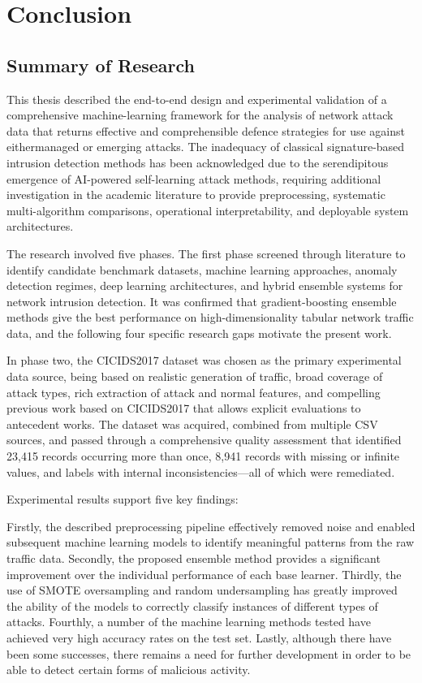 \chapter{Conclusion}

\label{chap:conclusion}

\setlength{\parskip}{0.8em}

\section{Summary of Research}

This thesis described the end-to-end design and experimental validation of a comprehensive machine-learning framework for the analysis of network attack data that returns effective and comprehensible defence strategies for use against eithermanaged or emerging attacks. The inadequacy of classical signature-based intrusion detection methods has been acknowledged due to the serendipitous emergence of AI-powered self-learning attack methods, requiring additional investigation in the academic literature to provide preprocessing, systematic multi-algorithm comparisons, operational interpretability, and deployable system architectures.

The research involved five phases. The first phase screened through literature to identify candidate benchmark datasets, machine learning approaches, anomaly detection regimes, deep learning architectures, and hybrid ensemble systems for network intrusion detection. It was confirmed that gradient-boosting ensemble methods give the best performance on high-dimensionality tabular network traffic data, and the following four specific research gaps motivate the present work.

In phase two, the CICIDS2017 dataset was chosen as the primary experimental data source, being based on realistic generation of traffic, broad coverage of attack types, rich extraction of attack and normal features, and compelling previous work based on CICIDS2017 that allows explicit evaluations to antecedent works. The dataset was acquired, combined from multiple CSV sources, and passed through a comprehensive quality assessment that identified 23{,}415 records occurring more than once, 8{,}941 records with missing or infinite values, and labels with internal inconsistencies—all of which were remediated.

Experimental results support five key findings:

Firstly, the described preprocessing pipeline effectively removed noise and enabled subsequent machine learning models to identify meaningful patterns from the raw traffic data.
Secondly, the proposed ensemble method provides a significant improvement over the individual performance of each base learner.
Thirdly, the use of SMOTE oversampling and random undersampling has greatly improved the ability of the models to correctly classify instances of different types of attacks.
Fourthly, a number of the machine learning methods tested have achieved very high accuracy rates on the test set.
Lastly, although there have been some successes, there remains a need for further development in order to be able to detect certain forms of malicious activity.

